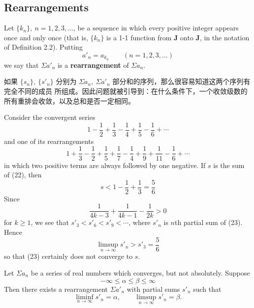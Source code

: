 \documentclass[../poma-notes.tex]{subfiles}
\begin{document}
\subsection*{Rearrangements}

\begin{definition}
  Let $\{k_n\},\ n=1,2,3,\dots$, be a sequence in which every positive integer appears once and only once
  (that is, $\{k_n\}$ is a 1-1 function from $\pmb{J}$ onto $\pmb{J}$, in the notation of Definition 2.2).
  Putting
  \[
    a'_n = a_{k_n} \qquad (n=1,2,3,\dots)
  \]
  we say that $\Sigma a'_n$ is a \textbf{rearrangement} of $\Sigma a_n$.
\end{definition}

如果 $\{s_n\},\ \{s'_n\}$ 分别为 $\Sigma a_n,\ \Sigma a'_n$ 部分和的序列，那么很容易知道这两个序列有完全不同的成员
所组成。因此问题就被引导到：在什么条件下，一个收敛级数的所有重排会收敛，以及总和是否一定相同。

\begin{example}
  Consider the convergent series
  \begin{equation}
    1 - \frac{1}{2} + \frac{1}{3} - \frac{1}{4} + \frac{1}{5} - \frac{1}{6} + \cdots
  \end{equation}
  and one of its rearrangements
  \begin{equation}
    1 + \frac{1}{3} - \frac{1}{2} + \frac{1}{5} + \frac{1}{7} - \frac{1}{4} + \frac{1}{9} + \frac{1}{11} -
    \frac{1}{6} + \cdots
  \end{equation}
  in which two positive terms are always followed by one negative. If $s$ is the sum of (22), then
  \[
    s < 1 - \frac{1}{2} + \frac{1}{3} = \frac{5}{6}
  \]
  Since
  \[
    \frac{1}{4k - 3} + \frac{1}{4k - 1} - \frac{1}{2k} > 0
  \]
  for $k \ge 1$, we see that $s'_3 < s'_6 < s'_9 < \cdots$, where $s'_n$ is $n$th partial sum of (23).
  Hence
  \[
    \limsup_{n\to\infty} s'_n > s'_3 = \frac{5}{6}
  \]
  so that (23) certainly does not converge to $s$.
\end{example}

\begin{theorem}
  Let $\Sigma a_n$ be a series of real numbers which converges, but not absolutely. Suppose
  \[
    -\infty \le \alpha \le \beta \le \infty
  \]
  Then there exists a rearrangement $\Sigma a'_n$ with partial sums $s'_n$ such that
  \begin{equation}
    \liminf_{n\to\infty} s'_n = \alpha, \qquad \limsup_{n\to\infty} s'_n = \beta.
  \end{equation}
\end{theorem}

\end{document}

